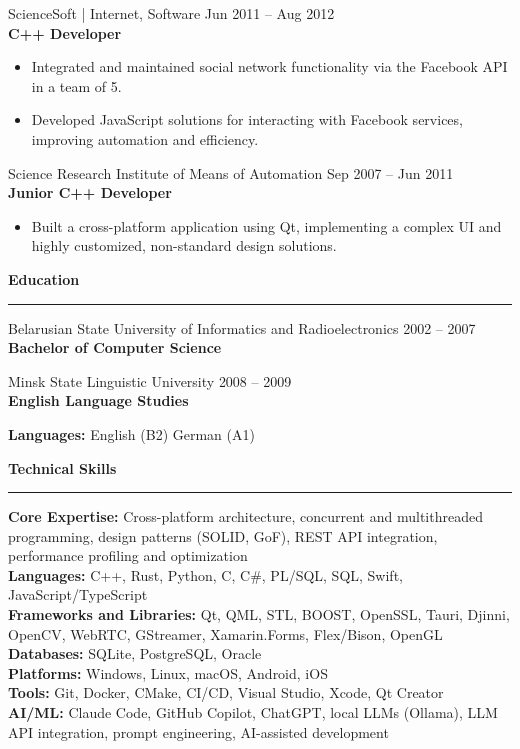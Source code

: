 \documentclass[10pt, a4paper]{article}
\newcommand{\heading}[1]{%
    \vspace{4pt}%
    \begin{center}{\color{accent}\large\bfseries #1}\end{center}%
    \vspace{-8pt}%
    \textcolor{accent}{\rule{\textwidth}{0.4pt}}%
    \vspace{4pt}%
}
\newcommand{\roleentry}[3]{%
    \vspace{8pt}%
    {\normalsize #1 \hfill {\small\color{graytext}#3}}\\[1pt]%
    {\textbf{#2}}%
    \vspace{1pt}%
}
\begin{document}
\roleentry{ScienceSoft | Internet, Software}{C++ Developer}{Jun 2011 -- Aug 2012}
\begin{itemize}
    \item Integrated and maintained social network functionality via the Facebook API in a team of 5.
    \item Developed JavaScript solutions for interacting with Facebook services, improving automation and efficiency.
\end{itemize}

\roleentry{Science Research Institute of Means of Automation}{Junior C++ Developer}{Sep 2007 -- Jun 2011}
\begin{itemize}
    \item Built a cross-platform application using Qt, implementing a complex UI and highly customized, non-standard design solutions.
\end{itemize}

\heading{Education}

\roleentry{Belarusian State University of Informatics and Radioelectronics}{Bachelor of Computer Science}{2002 -- 2007}

\roleentry{Minsk State Linguistic University}{English Language Studies}{2008 -- 2009}

\vspace{4pt}
\noindent\small\textbf{Languages:} English (B2) \enspace\textperiodcentered\enspace German (A1)

\heading{Technical Skills}

\noindent
\textbf{Core Expertise:} Cross-platform architecture, concurrent and multithreaded programming, design patterns (SOLID, GoF), REST API integration, performance profiling and optimization\\[2pt]
\textbf{Languages:} C++, Rust, Python, C, C\#, PL/SQL, SQL, Swift, JavaScript/TypeScript\\[2pt]
\textbf{Frameworks and Libraries:} Qt, QML, STL, BOOST, OpenSSL, Tauri, Djinni, OpenCV, WebRTC, GStreamer, Xamarin.Forms, Flex/Bison, OpenGL\\[2pt]
\textbf{Databases:} SQLite, PostgreSQL, Oracle\\[2pt]
\textbf{Platforms:} Windows, Linux, macOS, Android, iOS\\[2pt]
\textbf{Tools:} Git, Docker, CMake, CI/CD, Visual Studio, Xcode, Qt Creator\\[2pt]
\textbf{AI/ML:} Claude Code, GitHub Copilot, ChatGPT, local LLMs (Ollama), LLM API integration, prompt engineering, AI-assisted development
\end{document}
